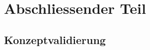 \part{Abschliessender Teil}
\label{part:AbschliessenderTeil}

\chapter{Konzeptvalidierung}
\label{chap:Konzeptvalidierung}